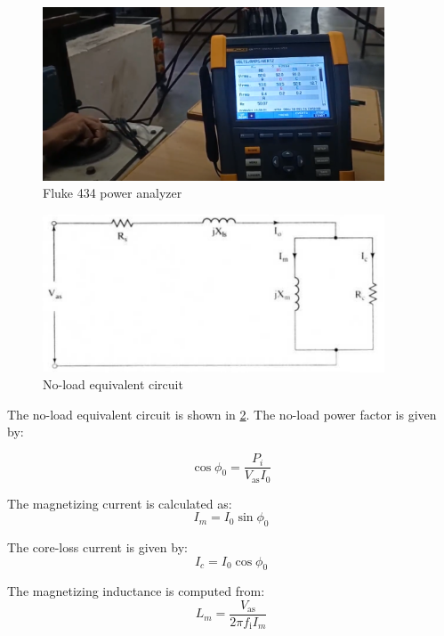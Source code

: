 
\begin{figure}
	\centering
	\includegraphics[width=4in]{sections/section5/images/ParamEstim/FlukeVoltAmpHertz.png}
	\caption{Fluke 434 power analyzer}
	\label{fig:fluke434}
\end{figure}


\begin{figure}
	\centering
	\includegraphics[width=4in]{sections/section5/images/ParamEstim/noloadCircuitKrish.png}
	\caption{No-load equivalent circuit}
	\label{fig:no_load_test}
\end{figure}

The no-load equivalent circuit is shown in \ref{fig:no_load_test}. The no-load power factor is given by:

\begin{equation}
\cos \phi_0 = \frac{P_i}{V_\text{as}I_0}
\end{equation}

The magnetizing current is calculated as:
\begin{equation}
I_m = I_0 \sin \phi_0
\end{equation}

The core-loss current is given by:
\begin{equation}
I_c = I_0 \cos \phi_0
\end{equation}

The magnetizing inductance is computed from:
\begin{equation}
L_m = \frac{V_\text{as}}{2\pi f_\text{i}I_m}
\end{equation}

